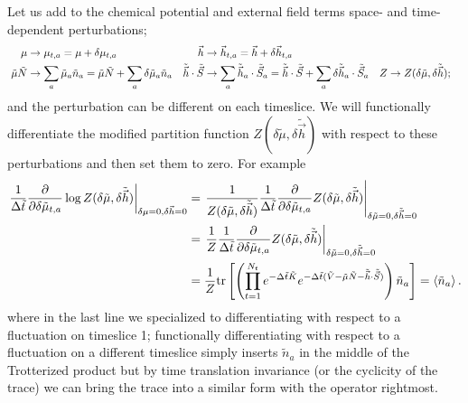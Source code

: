 Let us add to the chemical potential and external field terms space- and time-dependent perturbations;
\begin{align}
	\mu &\rightarrow \mu_{t,a} = \mu + \delta \mu_{t,a}
	&
	\vec{h} &\rightarrow \vec{h}_{t,a} = \vec{h} + \delta \vec{h}_{t,a}
	\\\
	\tilde{\mu} \tilde{N} & \rightarrow \sum_a \tilde{\mu}_a \tilde{n}_a = \tilde{\mu}\tilde{N} + \sum_a \delta\tilde{\mu}_a \tilde{n}_a
	&
	\tilde{\vec{h}} \cdot \tilde{\vec{S}} & \rightarrow \sum_a \tilde{\vec{h}}_a\cdot \tilde{\vec{S}}_a = \tilde{\vec{h}}\cdot\tilde{\vec{S}} + \sum_a \delta\tilde{\vec{h}}_a \cdot \tilde{\vec{S}}_a
	&
	Z &\rightarrow Z(\delta\tilde{\mu}, \delta\tilde{\vec{h}});
	\label{eq:local perturbations}
\end{align}
and the perturbation can be different on each timeslice.
We will functionally differentiate the modified partition function $Z(\delta\tilde{\mu}, \delta\tilde{\vec{h}})$ with respect to these perturbations and then set them to zero.
For example
\begin{align}
	\left.\frac{1}{\Delta\tilde{t}} \frac{\partial}{\partial \delta\tilde{\mu}_{t,a}} \log Z(\delta\tilde{\mu}, \delta\tilde{\vec{h}})\right|_{\delta\mu=0, \delta\vec{h}=0}
	&=
	\left.\frac{1}{Z(\delta\tilde{\mu}, \delta\tilde{\vec{h}})} \frac{1}{\Delta\tilde{t}} \frac{\partial}{\partial \delta\tilde{\mu}_{t,a}} Z(\delta\tilde{\mu}, \delta\tilde{\vec{h}})\right|_{\delta\tilde{\mu}=0, \delta\tilde{\vec{h}}=0}
	\nonumber\\
	&=
	\left.\frac{1}{Z} \frac{1}{\Delta\tilde{t}} \frac{\partial}{\partial \delta\tilde{\mu}_{t,a}} Z(\delta\tilde{\mu}, \delta\tilde{\vec{h}})\right|_{\delta\tilde{\mu}=0, \delta\tilde{\vec{h}}=0}
	\nonumber\\
	&=\frac{1}{Z} \text{tr}\left[\left(\prod_{t=1}^{N_t}e^{-\Delta\tilde{t} \tilde{K}} e^{-\Delta\tilde{t}(\tilde{V} -\tilde{\mu}\tilde{N} - \tilde{\vec{h}}\cdot\tilde{\vec{S}})}\right) \tilde{n}_a\right] 
	= \left\langle \tilde{n}_a \right\rangle.
	\label{eq:functionally differentiate}
\end{align}
where in the last line we specialized to differentiating with respect to a fluctuation on timeslice 1; functionally differentiating with respect to a fluctuation on a different timeslice simply inserts $\tilde{n}_a$ in the middle of the Trotterized product but by time translation invariance (or the cyclicity of the trace) we can bring the trace into a similar form with the operator rightmost.

